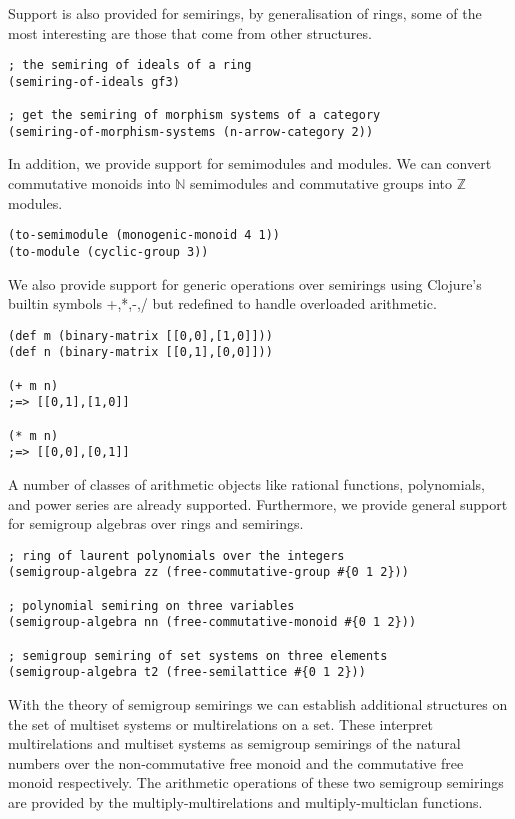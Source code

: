 \documentclass[a4paper,11pt]{report}
\begin{document}
\newpage

Support is also provided for semirings, by generalisation of rings, some of the most interesting are those that come from other structures. 

\begin{lstlisting}
; the semiring of ideals of a ring
(semiring-of-ideals gf3)

; get the semiring of morphism systems of a category
(semiring-of-morphism-systems (n-arrow-category 2))
\end{lstlisting}

In addition, we provide support for semimodules and modules. We can convert commutative monoids into $\mathbb{N}$ semimodules and commutative groups into $\mathbb{Z}$ modules.

\begin{lstlisting}
(to-semimodule (monogenic-monoid 4 1))
(to-module (cyclic-group 3))
\end{lstlisting}

We also provide support for generic operations over semirings using Clojure's builtin symbols +,*,-,/ but redefined to handle overloaded arithmetic.

\begin{lstlisting}
(def m (binary-matrix [[0,0],[1,0]]))
(def n (binary-matrix [[0,1],[0,0]]))

(+ m n)
;=> [[0,1],[1,0]]

(* m n)
;=> [[0,0],[0,1]]
\end{lstlisting}

A number of classes of arithmetic objects like rational functions, polynomials, and power series are already supported. Furthermore, we provide general support for semigroup algebras over rings and semirings.

\begin{lstlisting}
; ring of laurent polynomials over the integers
(semigroup-algebra zz (free-commutative-group #{0 1 2}))

; polynomial semiring on three variables
(semigroup-algebra nn (free-commutative-monoid #{0 1 2}))

; semigroup semiring of set systems on three elements
(semigroup-algebra t2 (free-semilattice #{0 1 2}))
\end{lstlisting}

With the theory of semigroup semirings we can establish additional structures on the set of multiset systems or multirelations on a set. These interpret multirelations and multiset systems as semigroup semirings of the natural numbers over the non-commutative free monoid and the commutative free monoid respectively. The arithmetic operations of these two semigroup semirings are provided by the multiply-multirelations and multiply-multiclan functions.
\end{document}
